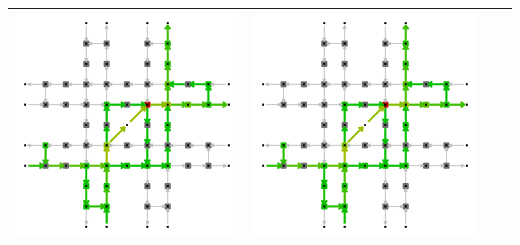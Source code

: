 \begin{table}[b]
\begin{tabularx}{\textwidth}{|Y|Y|Y|Y|}
		\includegraphics[trim=0 0 0 -4,scale=0.155]{../gfx/data/AggrMobilityGraph3.png} &
		\includegraphics[trim=0 0 0 -4,scale=0.155]{../gfx/data/AggrMobilityGraph3.png} \\ \hline
		

\end{tabularx}
\end{table}
